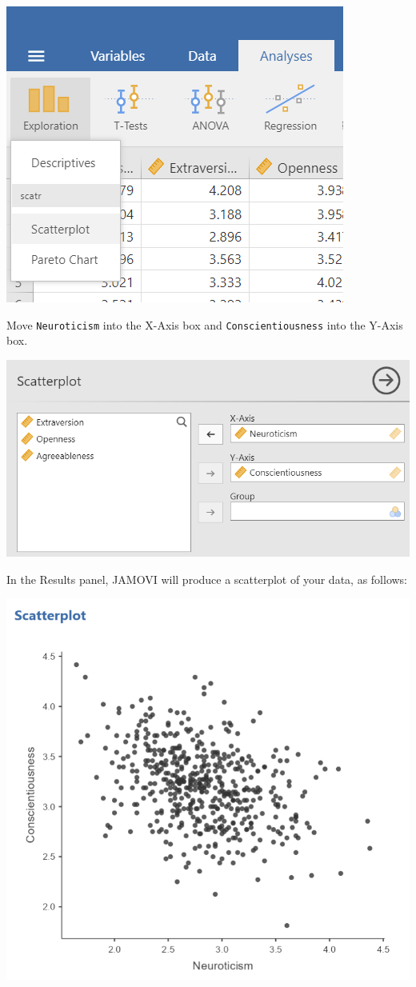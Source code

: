 \documentclass[
]{book}
\begin{document}
\includegraphics{img/Scatterplot_Commands.png}

Move \texttt{Neuroticism} into the X-Axis box and \texttt{Conscientiousness} into the Y-Axis box.

\includegraphics{img/Scatterplot_Variables.png}

In the Results panel, JAMOVI will produce a scatterplot of your data, as follows:

\includegraphics{img/Scatterplot_Output.png}
\end{document}
